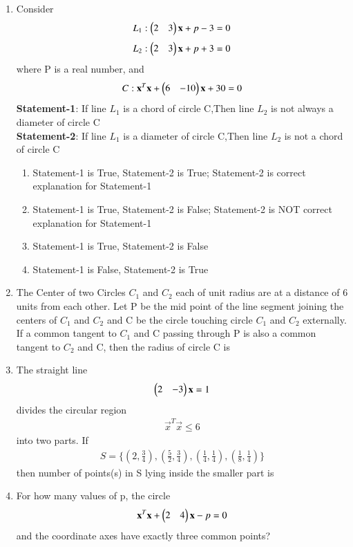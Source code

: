 \begin{enumerate}[label=\arabic*.,ref=\thesubsection.\theenumi]
\item Consider 
\begin{align}
L_1:\begin{pmatrix}2&3\end{pmatrix}\mathbf x+p-3=0
\end{align} 
\begin{align}
L_2:\begin{pmatrix}2&3\end{pmatrix}\mathbf x+p+3=0
\end{align} 
where P is a real number, and 
\begin{align}
C:\mathbf x^T\mathbf x+\begin{pmatrix}6&-10\end{pmatrix}\mathbf x+30=0
\end{align}
\textbf{Statement-1}: If line $L_1$ is a chord of circle C,Then line $L_2$ is not always a diameter of circle C\\
\textbf{Statement-2}: If line $L_1$ is a diameter of circle C,Then line $L_2$ is not a chord of circle C
\begin{enumerate}     
\item Statement-1 is True, Statement-2 is True; Statement-2 is correct explanation for Statement-1
\item Statement-1 is True, Statement-2 is False; Statement-2 is NOT correct explanation for Statement-1
\item Statement-1 is True, Statement-2 is False 
\item Statement-1 is False, Statement-2 is True 
\end{enumerate}


\item The Center of two Circles $C_1$ and $C_2$ each of unit radius are at a distance of 6 units from each other. Let P be the mid point of the line segment joining the centers of $C_1$ and $C_2$ and C be the circle touching circle $C_1$ and $C_2$ externally. If a common tangent to $C_1$ and C passing through P is also a common tangent to $C_2$ and C, then the radius of circle C is

\item The straight line 
\begin{align}
\begin{pmatrix}2&-3\end{pmatrix}\mathbf x=1
\end{align} 
divides the circular region 
\begin{align}\vec x^T\vec x \leq 6
\end{align} 
into two parts. If 
\begin{align}
S=\{(2, \frac{3}{4}), (\frac{5}{2}, \frac{3}{4}), (\frac{1}{4}, \frac{1}{4}), (\frac{1}{8}, \frac{1}{4})\}
\end{align} 
then number of points(s) in S lying inside the smaller part is
    
\item For how many values of p, the circle 
\begin{align}
\mathbf x^T\mathbf x+\begin{pmatrix}2&4\end{pmatrix}\mathbf x-p=0
\end{align}
and the coordinate axes have exactly three common points?
 

\end{enumerate}
